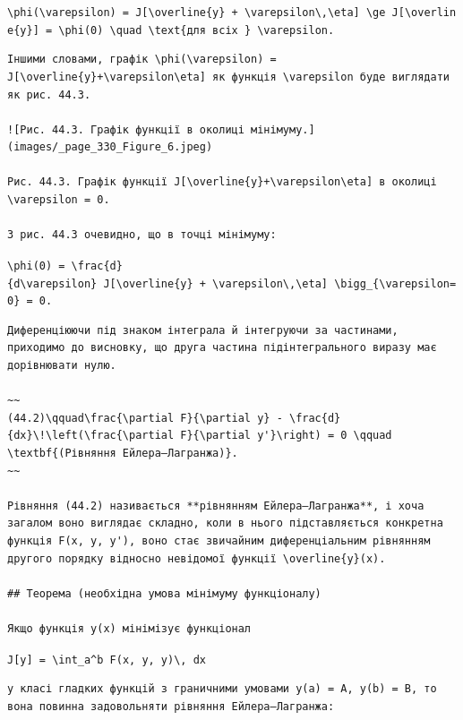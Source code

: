 \documentclass[
  ukrainian,
]{article}
\begin{document}
\texttt{\textbackslash{}phi(\textbackslash{}varepsilon)\ =\ J{[}\textbackslash{}overline\{y\}\ +\ \textbackslash{}varepsilon\textbackslash{},\textbackslash{}eta{]}\ \textbackslash{}ge\ J{[}\textbackslash{}overline\{y\}{]}\ =\ \textbackslash{}phi(0)\ \textbackslash{}quad\ \textbackslash{}text\{для\ всіх\ \}\ \textbackslash{}varepsilon.}

\begin{verbatim}
Іншими словами, графік \phi(\varepsilon) = J[\overline{y}+\varepsilon\eta] як функція \varepsilon буде виглядати як рис. 44.3.

![Рис. 44.3. Графік функції в околиці мінімуму.](images/_page_330_Figure_6.jpeg)

Рис. 44.3. Графік функції J[\overline{y}+\varepsilon\eta] в околиці \varepsilon = 0.

З рис. 44.3 очевидно, що в точці мінімуму:
\end{verbatim}

\texttt{\textbackslash{}phi\textquotesingle{}(0)\ =\ \textbackslash{}frac\{d\}\{d\textbackslash{}varepsilon\}\ J{[}\textbackslash{}overline\{y\}\ +\ \textbackslash{}varepsilon\textbackslash{},\textbackslash{}eta{]}\ \textbackslash{}bigg\textbar{}\_\{\textbackslash{}varepsilon=0\}\ =\ 0.}

\begin{verbatim}
Диференціюючи під знаком інтеграла й інтегруючи за частинами, приходимо до висновку, що друга частина підінтегрального виразу має дорівнювати нулю.

~~
(44.2)\qquad\frac{\partial F}{\partial y} - \frac{d}{dx}\!\left(\frac{\partial F}{\partial y'}\right) = 0 \qquad \textbf{(Рівняння Ейлера–Лагранжа)}.
~~

Рівняння (44.2) називається **рівнянням Ейлера–Лагранжа**, і хоча загалом воно виглядає складно, коли в нього підставляється конкретна функція F(x, y, y'), воно стає звичайним диференціальним рівнянням другого порядку відносно невідомої функції \overline{y}(x).

## Теорема (необхідна умова мінімуму функціоналу)

Якщо функція y(x) мінімізує функціонал
\end{verbatim}

\texttt{J{[}y{]}\ =\ \textbackslash{}int\_a\^{}b\ F(x,\ y,\ y\textquotesingle{})\textbackslash{},\ dx}

\begin{verbatim}
у класі гладких функцій з граничними умовами y(a) = A, y(b) = B, то вона повинна задовольняти рівняння Ейлера–Лагранжа:
\end{verbatim}
\end{document}
